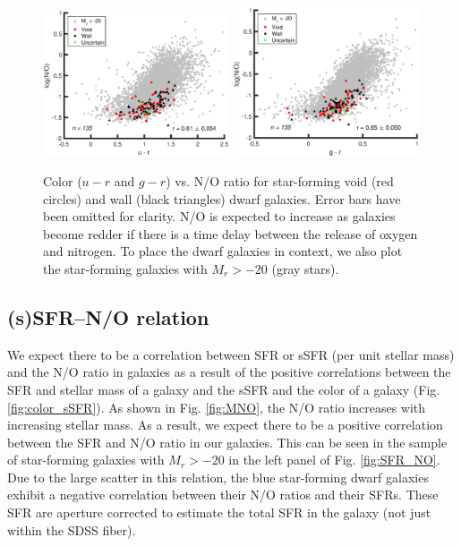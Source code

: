 \begin{figure}
    \includegraphics[width=0.49\textwidth]{Images/Paper2/ur_NO_1sig_I06_dwarf_0-20_SF_t3}
    \includegraphics[width=0.49\textwidth]{Images/Paper2/gr_NO_1sig_I06_dwarf_0-20_SF_t3}
    \caption[Color versus N/O for 135 dwarf galaxy sample]{Color ($u-r$ and 
    $g-r$) vs. N/O ratio for star-forming void (red circles) and wall (black 
    triangles) dwarf galaxies.  Error bars have been omitted for clarity.  N/O 
    is expected to increase as galaxies become redder if there is a time delay 
    between the release of oxygen and nitrogen.  To place the dwarf galaxies in 
    context, we also plot the star-forming galaxies with $M_r > -20$ 
    (gray stars).}
    \label{fig:color_NO}
\end{figure}


\subsection{(s)SFR--N/O relation}

We expect there to be a correlation between SFR or sSFR (per unit stellar mass) 
and the N/O ratio in galaxies as a result of the positive correlations between 
the SFR and stellar mass of a galaxy \citep{Brinchmann04} and the sSFR and the 
color of a galaxy (Fig. \ref{fig:color_sSFR}).  As shown in Fig. \ref{fig:MNO}, 
the N/O ratio increases with increasing stellar mass.  As a result, we expect 
there to be a positive correlation between the SFR and N/O ratio in our 
galaxies.  This can be seen in the sample of star-forming galaxies with 
$M_r > -20$ in the left panel of Fig. \ref{fig:SFR_NO}.  Due to the large 
scatter in this relation, the blue star-forming dwarf galaxies exhibit a 
negative correlation between their N/O ratios and their SFRs.  These SFR are 
aperture corrected to estimate the total SFR in the galaxy (not just within the 
SDSS fiber).

